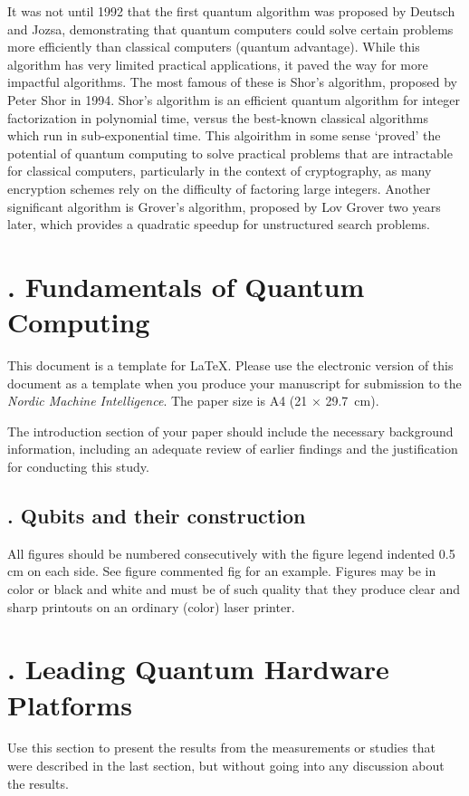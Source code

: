 \documentclass{elbioimp2}
\begin{document}
It was not until 1992 that the first quantum algorithm was proposed by Deutsch and Jozsa\cite{Deutsch1992},
demonstrating that quantum computers could solve certain problems more efficiently than classical computers 
(quantum advantage). While this algorithm has very limited practical applications, it paved the way for more 
impactful algorithms.
The most famous of these is Shor's algorithm, proposed by Peter Shor in 1994\cite{Shor1994}. Shor's algorithm 
is an efficient quantum algorithm for integer factorization in polynomial time, versus the best-known classical
algorithms which run in sub-exponential time. This algoirithm in some sense `proved' the potential of quantum computing
to solve practical problems that are intractable for classical computers, particularly in the context of cryptography, as
many encryption schemes rely on the difficulty of factoring large integers. 
Another significant algorithm is Grover's algorithm, proposed by Lov Grover two years later\cite{Grover1996}, which provides
a quadratic speedup for unstructured search problems.


\section{. Fundamentals of Quantum Computing}
This document is a template for \LaTeX. 
Please use the electronic version of this document as a
template when you produce your manuscript for submission to the
\emph{Nordic Machine Intelligence}. The paper size is A4 (21 × 
29.7~cm).

The introduction section of your paper should include the necessary
background information, including an adequate review of earlier
findings and the justification for conducting this study.

\subsection{. Qubits and their construction}
All figures should be numbered consecutively with the figure legend
indented 0.5\,cm on each side. See figure commented fig for an example.
Figures may be in color or black and white and must be of such quality
that they produce clear and sharp printouts on an ordinary (color)
laser printer.


\section{. Leading Quantum Hardware Platforms}
Use this section to present the results from the measurements or
studies that were described in the last section, but without going
into any discussion about the results.
\end{document}
